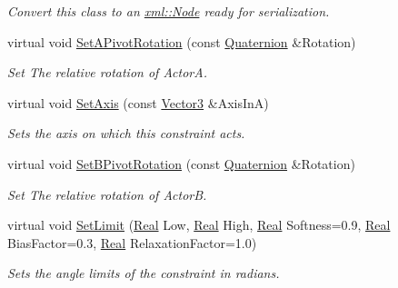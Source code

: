 \begin{DoxyCompactItemize}
\begin{DoxyCompactList}\small\item\em Convert this class to an \hyperlink{classMezzanine_1_1xml_1_1Node}{xml::Node} ready for serialization. \item\end{DoxyCompactList}\item 
virtual void \hyperlink{classMezzanine_1_1HingeConstraint_aa38c63cb80624e1e26043cf84e5c01c2}{SetAPivotRotation} (const \hyperlink{classMezzanine_1_1Quaternion}{Quaternion} \&Rotation)
\begin{DoxyCompactList}\small\item\em Set The relative rotation of ActorA. \item\end{DoxyCompactList}\item 
virtual void \hyperlink{classMezzanine_1_1HingeConstraint_a4c8bbe6e1d7f1fec78b1e8b0296ad61f}{SetAxis} (const \hyperlink{classMezzanine_1_1Vector3}{Vector3} \&AxisInA)
\begin{DoxyCompactList}\small\item\em Sets the axis on which this constraint acts. \item\end{DoxyCompactList}\item 
virtual void \hyperlink{classMezzanine_1_1HingeConstraint_a99f32e38d0df3bdfb266f36b83f4f1f6}{SetBPivotRotation} (const \hyperlink{classMezzanine_1_1Quaternion}{Quaternion} \&Rotation)
\begin{DoxyCompactList}\small\item\em Set The relative rotation of ActorB. \item\end{DoxyCompactList}\item 
virtual void \hyperlink{classMezzanine_1_1HingeConstraint_ac6d39a9c3da1aa6611507fdcf9b9e901}{SetLimit} (\hyperlink{namespaceMezzanine_a726731b1a7df72bf3583e4a97282c6f6}{Real} Low, \hyperlink{namespaceMezzanine_a726731b1a7df72bf3583e4a97282c6f6}{Real} High, \hyperlink{namespaceMezzanine_a726731b1a7df72bf3583e4a97282c6f6}{Real} Softness=0.9, \hyperlink{namespaceMezzanine_a726731b1a7df72bf3583e4a97282c6f6}{Real} BiasFactor=0.3, \hyperlink{namespaceMezzanine_a726731b1a7df72bf3583e4a97282c6f6}{Real} RelaxationFactor=1.0)
\begin{DoxyCompactList}\small\item\em Sets the angle limits of the constraint in radians. \item\end{DoxyCompactList}\item 

\end{DoxyCompactItemize}
